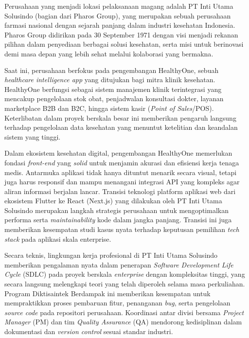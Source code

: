 Perusahaan yang menjadi lokasi pelaksanaan magang adalah PT Inti Utama
Solusindo (bagian dari Pharos Group), yang merupakan sebuah perusahaan farmasi
nasional dengan sejarah panjang dalam industri kesehatan Indonesia. Pharos
Group didirikan pada 30 September 1971 dengan visi menjadi rekanan pilihan
dalam penyediaan berbagai solusi kesehatan, serta misi untuk berinovasi demi
masa depan yang lebih sehat melalui kolaborasi yang bermakna\cite{aboutpharos}.

Saat ini, perusahaan berfokus pada pengembangan HealthyOne, sebuah
\textit{healthcare intelligence app} yang ditujukan bagi mitra klinik
kesehatan. HealthyOne berfungsi sebagai sistem manajemen klinik terintegrasi
yang mencakup pengelolaan stok obat, penjadwalan konsultasi dokter, layanan
marketplace B2B dan B2C, hingga sistem kasir (\textit{Point of Sales}/POS).
Keterlibatan dalam proyek berskala besar ini memberikan pengaruh langsung
terhadap pengelolaan data kesehatan yang menuntut ketelitian dan keandalan
sistem yang tinggi.

Dalam ekosistem kesehatan digital, pengembangan HealthyOne memerlukan fondasi
\textit{front-end} yang \textit{solid} untuk menjamin akurasi dan efisiensi
kerja tenaga medis. Antarmuka aplikasi tidak hanya dituntut menarik secara
visual, tetapi juga harus responsif dan mampu menangani integrasi API yang
kompleks agar aliran informasi berjalan lancar. Transisi teknologi platform
aplikasi web dari ekosistem Flutter ke React (Next.js) yang dilakukan oleh PT
Inti Utama Solusindo merupakan langkah strategis perusahaan untuk
mengoptimalkan performa serta \textit{maintainability} kode dalam jangka
panjang. Transisi ini juga memberikan kesempatan studi kasus nyata terhadap
keputusan pemilihan \textit{tech stack} pada aplikasi skala enterprise.

Secara teknis, lingkungan kerja profesional di PT Inti Utama Solusindo
memberikan pengalaman nyata dalam penerapan \textit{Software Development Life
    Cycle} (SDLC) pada proyek berskala \textit{enterprise} dengan kompleksitas
tinggi, yang secara langsung melengkapi teori yang telah diperoleh selama masa
perkuliahan. Program Diktisaintek Berdampak ini memberikan kesempatan untuk
mempraktikkan proses pembaruan fitur, penanganan \textit{bug}, serta
pengelolaan \textit{source code} pada repositori perusahaan. Koordinasi antar
divisi bersama \textit{Project Manager} (PM) dan tim \textit{Quality Assurance}
(QA) mendorong kedisiplinan dalam dokumentasi dan \textit{version control}
sesuai standar industri.